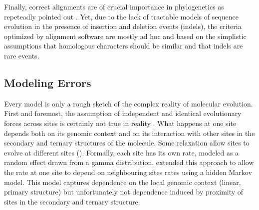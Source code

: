 
Finally, correct alignments are of crucial importance in phylogenetics as repeteadly pointed out \citep{morrison1997effects,ogden2006multiple,talavera2007improvement,wong2008alignment}. Yet, due to the lack of tractable models of sequence evolution in the presence of insertion and deletion events (indels), the criteria optimized by alignment software are mostly ad hoc  and based on the simplistic assumptions that homologous characters should be similar and that indels are rare events.


\subsection{Modeling Errors} \label{sec:modeling-errors}
%
Every model is only a rough sketch of the complex reality of molecular evolution. First and foremost, the assumption of independent and identical evolutionary forces across sites is certainly not true in reality \citep{Piau}. What happens at one site depends both on its genomic context and on its interaction with other sites in the secondary and ternary structures of the molecule. Some relaxation allow sites to evolve at different sites (\cite{goldman1994codon}). Formally, each site has its own rate, modeled as a random effect drawn from a gamma distribution. \cite{felsenstein1996hidden} extended this approach to allow the rate at one site to depend on neighbouring sites rates using a hidden Markov model. This model captures dependence on the local genomic context (linear, primary structure) but unfortunately not dependence induced by proximity of sites in the secondary and ternary structure.


